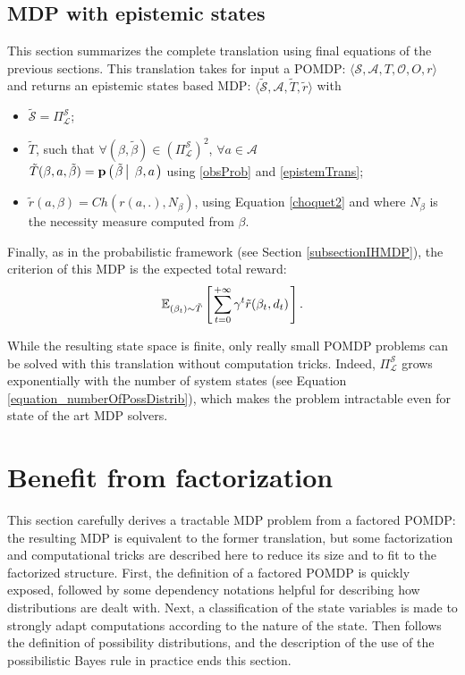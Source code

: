\subsection{MDP with epistemic states}
This section summarizes the complete translation using final
equations of the previous sections.
This translation takes for input a POMDP: $\langle \mathcal{S},\mathcal{A},T,\mathcal{O},O,r \rangle$
and returns an epistemic states based MDP: $\langle \tilde{\mathcal{S}},\mathcal{A},\tilde{T},\tilde{r} \rangle$ with
\begin{itemize}
\item $\tilde{\mathcal{S}} = \Pi^{\mathcal{S}}_{\mathcal{L}}$;
\item $\tilde{T}$, such that $\forall (\beta, \tilde{\beta}) \in (\Pi^{\mathcal{S}}_{\mathcal{L}})^2$, $\forall a \in \mathcal{A}$ \\
$\tilde{T}(\beta,a,\tilde{\beta}) = \textbf{p} \left( \left.  \tilde{\beta} \, \right| \left. \, \beta,a  \right. \right)$ 
 using \ref{obsProb} and \ref{epistemTrans};
\item $\tilde{r}(a,\beta) = Ch(r(a,.),N_{\beta})$, using Equation \ref{choquet2} and where $N_{\beta}$ is the necessity
measure computed from $\beta$.
\end{itemize}
Finally, as in the probabilistic framework (see Section \ref{subsectionIHMDP}),
the criterion of this MDP is the expected total reward: 
\[ \mathbb{E}_{ (\beta_t) \sim \tilde{T}} \left[ \left.  \sum_{t=0}^{+ \infty} \gamma^t \tilde{r}(\beta_t,d_t)  \right. \right].\]

While the resulting state space is finite, 
only really small POMDP problems can be solved 
with this translation without computation tricks.
Indeed, $\Pi^{\mathcal{S}}_{\mathcal{L}}$ grows exponentially 
with the number of system states (see Equation \ref{equation_numberOfPossDistrib}), 
which makes the problem intractable even for state of the art MDP solvers.

\section{Benefit from factorization}
\label{factorizationSection}
This section carefully derives a tractable MDP problem from a factored POMDP: 
the resulting MDP is equivalent to the former translation, but some factorization
and computational tricks are described here to reduce its size and to fit to the
factorized structure. First, the definition of a factored POMDP is quickly exposed,
followed by some dependency notations helpful for describing how distributions are dealt
with. Next, a classification of the state variables is made
to strongly adapt computations according to the nature of the state.
Then follows the definition of possibility distributions, 
and the description of the use of the possibilistic Bayes rule 
in practice ends this section.
